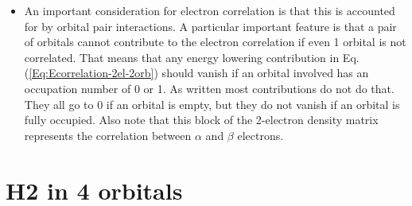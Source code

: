 \documentclass{amsart}
\begin{document}
\begin{itemize}
\begin{eqnarray}
\begin{matrix}
         0 & 0 & - d_2^\alpha d_1^\beta & 0 \\
         -\sqrt[4]{d_1^\alpha d_1^\beta d_2^\alpha d_2^\beta} & 0 &0 & \sqrt{d_2^\alpha d_2^\beta} - d_2^\alpha d_2^\beta
         \end{matrix}\right)
        \end{eqnarray}
\item An important consideration for electron correlation is that this is accounted for by orbital pair
         interactions. A particular important feature is that a pair of orbitals cannot contribute to the electron
         correlation if even 1 orbital is not correlated. That means that any energy lowering contribution in 
         Eq.(\ref{Eq:Ecorrelation-2el-2orb}) should vanish if an orbital involved has an occupation number
         of 0 or 1. As written most contributions do not do that. They all go to 0 if an orbital is empty, but
         they do not vanish if an orbital is fully occupied. Also note that this block of the 2-electron density 
         matrix represents the correlation between $\alpha$ and $\beta$ electrons.
\end{itemize}

\section{H2 in 4 orbitals}
\label{Subsect:h2-4orb}
\end{document}
